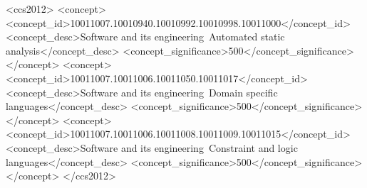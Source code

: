 \documentclass[acmsmall,screen,nonacm]{acmart}
\theoremstyle{definition}
\begin{document}
\begin{abstract}
	Satisfiability modulo theories (SMT) solving has become a critical part of
  many static analyses, including symbolic execution, refinement type checking,
  and model checking.
We propose \Name, a domain-specific language that makes it possible to write a
  range of SMT-based static analyses in a way that is both close to their
  formal specifications and amenable to high-level optimizations and efficient
  evaluation.

\Name extends the logic programming language Datalog with a first-order
  functional language and mechanisms for representing and reasoning about SMT
  formulas; a novel type system supports the construction of expressive
  formulas, while ensuring that neither normal evaluation nor SMT solving goes
  wrong.
Our case studies demonstrate that a range of SMT-based analyses can naturally
  and concisely be encoded in \Name, and that --- thanks to this encoding ---
  high-level Datalog-style optimizations can be automatically and
  advantageously applied to these analyses.
\end{abstract}


\begin{CCSXML}
<ccs2012>
   <concept>
       <concept_id>10011007.10010940.10010992.10010998.10011000</concept_id>
       <concept_desc>Software and its engineering~Automated static analysis</concept_desc>
       <concept_significance>500</concept_significance>
       </concept>
   <concept>
       <concept_id>10011007.10011006.10011050.10011017</concept_id>
       <concept_desc>Software and its engineering~Domain specific languages</concept_desc>
       <concept_significance>500</concept_significance>
       </concept>
   <concept>
       <concept_id>10011007.10011006.10011008.10011009.10011015</concept_id>
       <concept_desc>Software and its engineering~Constraint and logic languages</concept_desc>
       <concept_significance>500</concept_significance>
       </concept>
 </ccs2012>
\end{CCSXML}

\end{document}
